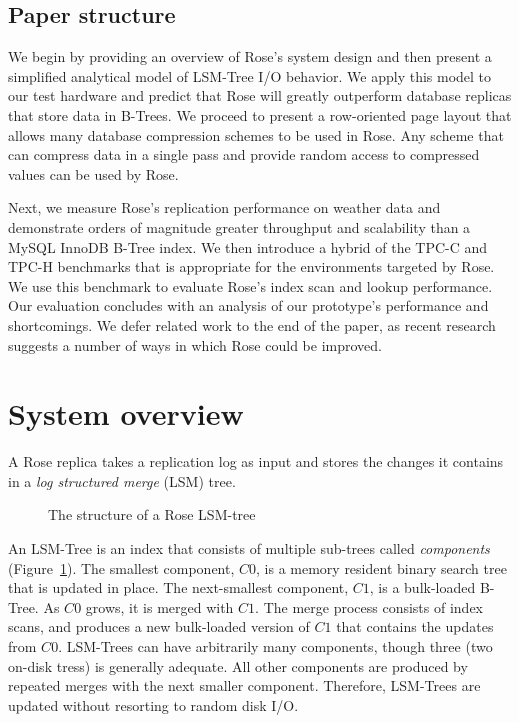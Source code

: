 \documentclass{vldb}
\newcommand{\rows}{Rose\xspace}
\newcommand{\rowss}{Rose's\xspace}
\begin{document}
\subsection{Paper structure}

We begin by providing an overview of \rowss system design and then
present a simplified analytical model of LSM-Tree I/O behavior.  We
apply this model to our test hardware and predict that \rows will
greatly outperform database replicas that store data in B-Trees.  We
proceed to present a row-oriented page layout that allows many
database compression schemes to be used in \rows.  Any scheme that can
compress data in a single pass and provide random access to compressed
values can be used by \rows.

Next, we
measure \rowss replication performance on weather data and
demonstrate orders of magnitude greater throughput and scalability than
a MySQL InnoDB B-Tree index.  We then introduce a hybrid of the
TPC-C and TPC-H benchmarks that is appropriate for the environments
targeted by \rows.  We use this benchmark to evaluate \rowss index scan and lookup performance.  Our evaluation concludes
with an analysis of our prototype's performance and shortcomings.  We
defer related work to the end of the paper, as recent research
suggests a number of ways in which \rows could be improved.

\section{System overview}

A \rows replica takes a replication log as input and stores the
changes it contains in a {\em log structured merge} (LSM)
tree\cite{lsm}.
\begin{figure}
\centering {}
\caption{The structure of a \rows LSM-tree}
\label{fig:lsm-tree}
\end{figure}
An LSM-Tree is an index that consists of multiple sub-trees called
{\em components} (Figure~\ref{fig:lsm-tree}).  The smallest component, $C0$, is a memory resident
binary search tree that is updated in place.  The next-smallest component, $C1$, is a bulk-loaded B-Tree.  As $C0$ grows,
it is merged with $C1$.  The merge process consists of index scans,
and produces a new bulk-loaded version of $C1$ that contains the
updates from $C0$.  LSM-Trees can have arbitrarily many components,
though three (two on-disk tress) is generally adequate.
All other
components are produced by repeated merges with the next smaller
component.  Therefore, LSM-Trees are updated without resorting to
random disk I/O.
\end{document}

